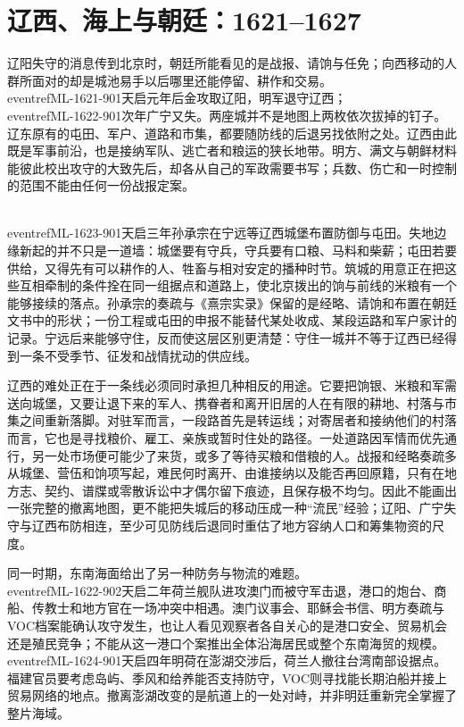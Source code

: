 \section{辽西、海上与朝廷：1621--1627}

辽阳失守的消息传到北京时，朝廷所能看见的是战报、请饷与任免；向西移动的人群所面对的却是城池易手以后哪里还能停留、耕作和交易。\\eventref{ML-1621-901}{天启元年后金攻取辽阳，明军退守辽西}；\\eventref{ML-1622-901}{次年广宁又失}。两座城并不是地图上两枚依次拔掉的钉子。辽东原有的屯田、军户、道路和市集，都要随防线的后退另找依附之处。辽西由此既是军事前沿，也是接纳军队、逃亡者和粮运的狭长地带。明方、满文与朝鲜材料能彼此校出攻守的大致先后，却各从自己的军政需要书写；兵数、伤亡和一时控制的范围不能由任何一份战报定案。

\\eventref{ML-1623-901}{天启三年孙承宗在宁远等辽西城堡布置防御与屯田}。失地边缘新起的并不只是一道墙：城堡要有守兵，守兵要有口粮、马料和柴薪；屯田若要供给，又得先有可以耕作的人、牲畜与相对安定的播种时节。筑城的用意正在把这些互相牵制的条件拴在同一组据点和道路上，使北京拨出的饷与前线的米粮有一个能够接续的落点。孙承宗的奏疏与《熹宗实录》保留的是经略、请饷和布置在朝廷文书中的形状；一份工程或屯田的申报不能替代某处收成、某段运路和军户家计的记录。宁远后来能够守住，反而使这层区别更清楚：守住一城并不等于辽西已经得到一条不受季节、征发和战情扰动的供应线。

辽西的难处正在于一条线必须同时承担几种相反的用途。它要把饷银、米粮和军需送向城堡，又要让退下来的军人、携眷者和离开旧居的人在有限的耕地、村落与市集之间重新落脚。对驻军而言，一段路首先是转运线；对寄居者和接纳他们的村落而言，它也是寻找粮价、雇工、亲族或暂时住处的路径。一处道路因军情而优先通行，另一处市场便可能少了来货，或多了等待买粮和借粮的人。战报和经略奏疏多从城堡、营伍和饷项写起，难民何时离开、由谁接纳以及能否再回原籍，只有在地方志、契约、谱牒或零散诉讼中才偶尔留下痕迹，且保存极不均匀。因此不能画出一张完整的撤离地图，更不能把失城后的移动压成一种“流民”经验；辽阳、广宁失守与辽西布防相连，至少可见防线后退同时重估了地方容纳人口和筹集物资的尺度。

同一时期，东南海面给出了另一种防务与物流的难题。\\eventref{ML-1622-902}{天启二年荷兰舰队进攻澳门而被守军击退}，港口的炮台、商船、传教士和地方官在一场冲突中相遇。澳门议事会、耶稣会书信、明方奏疏与VOC档案能确认攻守发生，也让人看见观察者各自关心的是港口安全、贸易机会还是殖民竞争；不能从这一港口个案推出全体沿海居民或整个东南海贸的规模。\\eventref{ML-1624-901}{天启四年明荷在澎湖交涉后，荷兰人撤往台湾南部设据点}。福建官员要考虑岛屿、季风和给养能否支持防守，VOC则寻找能长期泊船并接上贸易网络的地点。撤离澎湖改变的是航道上的一处对峙，并非明廷重新完全掌握了整片海域。

